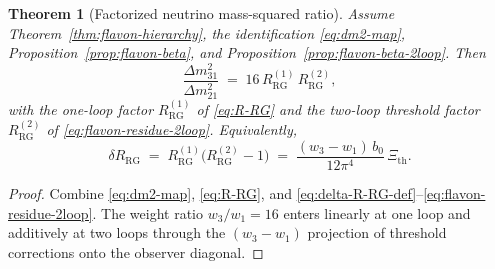 \documentclass[aps,prd,onecolumn,amsmath,amssymb,nofootinbib,11pt]{revtex4-2}
\numberwithin{equation}{section}
\theoremstyle{plain}
\newtheorem{theorem}{Theorem}[section]
\theoremstyle{definition}
\theoremstyle{remark}
\begin{document}
\begin{theorem}[Factorized neutrino mass-squared ratio]
\label{thm:nu-ratio-2loop}
Assume Theorem~\ref{thm:flavon-hierarchy}, the identification \eqref{eq:dm2-map},
Proposition~\ref{prop:flavon-beta}, and Proposition~\ref{prop:flavon-beta-2loop}.
Then
\begin{equation}\label{eq:nu-ratio-factorized}
  \frac{\Delta m^2_{31}}{\Delta m^2_{21}}
  \;=\;
  16\,R_{\mathrm{RG}}^{(1)}\,R_{\mathrm{RG}}^{(2)},
\end{equation}
with the one-loop factor $R_{\mathrm{RG}}^{(1)}$ of \eqref{eq:R-RG} and
the two-loop threshold factor $R_{\mathrm{RG}}^{(2)}$ of
\eqref{eq:flavon-residue-2loop}. Equivalently,
\begin{equation}\label{eq:R-RG-total}
  \delta R_{\mathrm{RG}}
  \;=\;
  R_{\mathrm{RG}}^{(1)}\bigl(R_{\mathrm{RG}}^{(2)}-1\bigr)
  \;=\;
  \frac{(w_3-w_1)\,b_0}{12\pi^4}\,\Xi_{\mathrm{th}}.
\end{equation}
\end{theorem}

\begin{proof}
Combine \eqref{eq:dm2-map}, \eqref{eq:R-RG}, and
\eqref{eq:delta-R-RG-def}--\eqref{eq:flavon-residue-2loop}. The weight ratio
$w_3/w_1=16$ enters linearly at one loop and additively at two loops through
the $(w_3-w_1)$ projection of threshold corrections onto the observer diagonal.
\end{proof}
\end{document}
